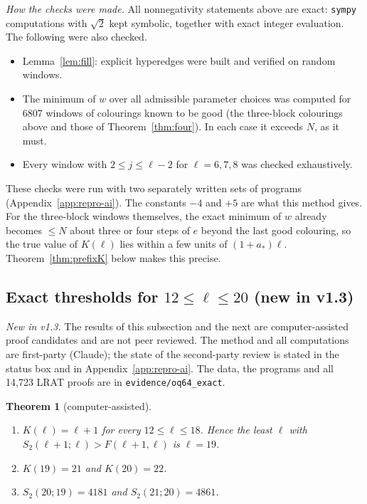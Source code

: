 \documentclass[11pt]{amsart}
\newtheorem{theorem}{Theorem}
\theoremstyle{definition}
\newcommand{\F}{F}
\newcommand{\Stwo}{S_2}
\begin{document}
\noindent\emph{How the checks were made.} All nonnegativity statements above are exact: \texttt{sympy} computations with $\sqrt2$ kept symbolic, together with exact integer evaluation. The following were also checked.
\begin{itemize}
\item Lemma~\ref{lem:fill}: explicit hyperedges were built and verified on random windows.
\item The minimum of $w$ over all admissible parameter choices was computed for 6807 windows of colourings known to be good (the three-block colourings above and those of Theorem~\ref{thm:four}). In each case it exceeds $N$, as it must.
\item Every window with $2\le j\le\ell-2$ for $\ell=6,7,8$ was checked exhaustively.
\end{itemize}
These checks were run with two separately written sets of programs (Appendix~\ref{app:repro-ai}). The constants $-4$ and $+5$ are what this method gives. For the three-block windows themselves, the exact minimum of $w$ already becomes $\le N$ about three or four steps of $e$ beyond the last good colouring, so the true value of $K(\ell)$ lies within a few units of $(1+a_*)\ell$. Theorem~\ref{thm:prefixK} below makes this precise.

\subsection{Exact thresholds for \texorpdfstring{$12\le\ell\le20$}{12<=l<=20} (new in v1.3)}\label{sec:exact}

\noindent\emph{New in v1.3.} The results of this subsection and the next are computer-assisted proof candidates and are not peer reviewed. The method and all computations are first-party (Claude); the state of the second-party review is stated in the status box and in Appendix~\ref{app:repro-ai}. The data, the programs and all 14{,}723 LRAT proofs are in \texttt{evidence/oq64\_exact}.

\begin{theorem}[computer-assisted]\label{thm:exact}
\begin{enumerate}[label=(\alph*)]
\item $K(\ell)=\ell+1$ for every $12\le\ell\le18$. Hence the least $\ell$ with $\Stwo(\ell+1;\ell)>\F(\ell+1,\ell)$ is $\ell=19$.
\item $K(19)=21$ and $K(20)=22$.
\item $\Stwo(20;19)=4181$ and $\Stwo(21;20)=4861$.
\end{enumerate}
\end{theorem}
\end{document}
